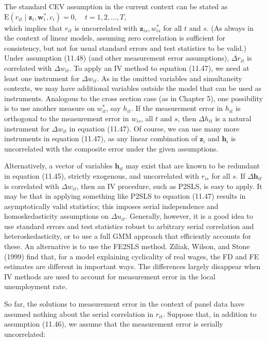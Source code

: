 \documentclass[10pt]{article}
\begin{document}
The standard CEV assumption in the current context can be stated as\\
$\mathrm{E}\left(r_{i t} \mid \mathbf{z}_{i}, \mathbf{w}_{i}^{*}, c_{i}\right)=0, \quad t=1,2, \ldots, T$,\\
which implies that $r_{i t}$ is uncorrelated with $\mathbf{z}_{i s}, w_{i s}^{*}$ for all $t$ and $s$. (As always in the context of linear models, assuming zero correlation is sufficient for consistency, but not for usual standard errors and test statistics to be valid.) Under assumption (11.48) (and other measurement error assumptions), $\Delta r_{i t}$ is correlated with $\Delta w_{i t}$. To apply an IV method to equation (11.47), we need at least one instrument for $\Delta w_{i t}$. As in the omitted variables and simultaneity contexts, we may have additional variables outside the model that can be used as instruments. Analogous to the cross section case (as in Chapter 5), one possibility is to use another measure on $w_{i t}^{*}$, say $h_{i t}$. If the measurement error in $h_{i t}$ is orthogonal to the measurement error in $w_{i s}$, all $t$ and $s$, then $\Delta h_{i t}$ is a natural instrument for $\Delta w_{i t}$ in equation (11.47). Of course, we can use many more instruments in equation (11.47), as any linear combination of $\mathbf{z}_{i}$ and $\mathbf{h}_{i}$ is uncorrelated with the composite error under the given assumptions.

Alternatively, a vector of variables $\mathbf{h}_{i t}$ may exist that are known to be redundant in equation (11.45), strictly exogenous, and uncorrelated with $r_{i s}$ for all $s$. If $\Delta \mathbf{h}_{i t}$ is correlated with $\Delta w_{i t}$, then an IV procedure, such as P2SLS, is easy to apply. It may be that in applying something like P2SLS to equation (11.47) results in asymptotically valid statistics; this imposes serial independence and homoskedasticity assumptions on $\Delta u_{i t}$. Generally, however, it is a good idea to use standard errors and test statistics robust to arbitrary serial correlation and heteroskedasticity, or to use a full GMM approach that efficiently accounts for these. An alternative is to use the FE2SLS method. Ziliak, Wilson, and Stone (1999) find that, for a model explaining cyclicality of real wages, the FD and FE estimates are different in important ways. The differences largely disappear when IV methods are used to account for measurement error in the local unemployment rate.

So far, the solutions to measurement error in the context of panel data have assumed nothing about the serial correlation in $r_{i t}$. Suppose that, in addition to assumption (11.46), we assume that the measurement error is serially uncorrelated:
\end{document}
